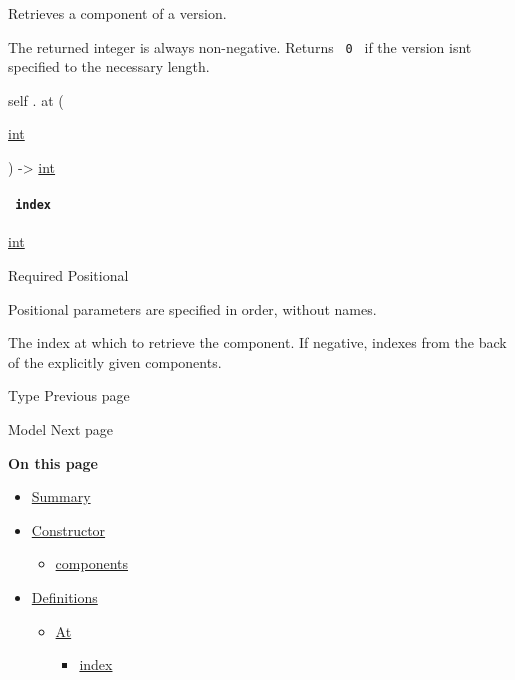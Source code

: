 Retrieves a component of a version.

The returned integer is always non-negative. Returns \texttt{\ 0\ } if
the version isn\textquotesingle t specified to the necessary length.

self { . } { at } (

{ \href{/docs/reference/foundations/int/}{int} }

) -\textgreater{} \href{/docs/reference/foundations/int/}{int}

\paragraph{\texorpdfstring{\texttt{\ index\ }}{ index }}\label{definitions-at-index}

\href{/docs/reference/foundations/int/}{int}

{Required} {{ Positional }}

\label{definitions-at-index-positional-tooltip}
Positional parameters are specified in order, without names.

The index at which to retrieve the component. If negative, indexes from
the back of the explicitly given components.

\href{/docs/reference/foundations/type/}{\pandocbounded{}}

{ Type } { Previous page }

\href{/docs/reference/model/}{\pandocbounded{}}

{ Model } { Next page }

\textbf{On this page}

\begin{itemize}
\tightlist
\item
  \hyperref[summary]{Summary}
\item
  \hyperref[constructor]{Constructor}

  \begin{itemize}
  \tightlist
  \item
    \hyperref[constructor-components]{components}
  \end{itemize}
\item
  \hyperref[definitions]{Definitions}

  \begin{itemize}
  \tightlist
  \item
    \hyperref[definitions-at]{At}

    \begin{itemize}
    \tightlist
    \item
      \hyperref[definitions-at-index]{index}
    \end{itemize}
  \end{itemize}
\end{itemize}


